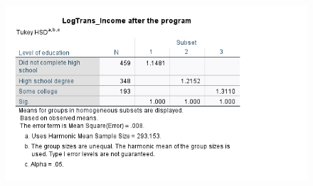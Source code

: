 \documentclass[english,10pt,a4paper]{article}
\begin{document}
			
		
		
		
		\begin{figure}[h]
			
			
			\includegraphics[width=1\linewidth]{IAPlog}
			
				\end{figure}
				
\end{document}
